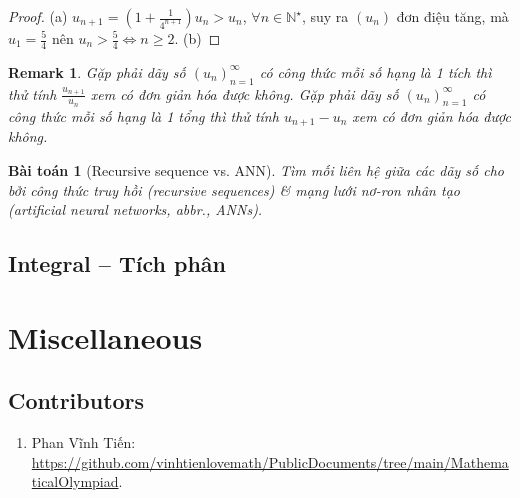 \documentclass{article}
\newtheorem{baitoan}{Bài toán}
\newtheorem{remark}{Remark}
\begin{document}
\begin{proof}
	(a) $u_{n+1} = \left(1 + \frac{1}{4^{n+1}}\right)u_n > u_n$, $\forall n\in\mathbb{N}^\star$, suy ra $(u_n)$ đơn điệu tăng, mà $u_1 = \frac{5}{4}$ nên $u_n > \frac{5}{4}\Leftrightarrow n\ge2$. (b)
\end{proof}

\begin{remark}
	Gặp phải dãy số $(u_n)_{n=1}^\infty$ có công thức mỗi số hạng là 1 tích thì thử tính $\frac{u_{n+1}}{u_n}$ xem có đơn giản hóa được không. Gặp phải dãy số $(u_n)_{n=1}^\infty$ có công thức mỗi số hạng là 1 tổng thì thử tính $u_{n+1} - u_n$ xem có đơn giản hóa được không.
\end{remark}

\begin{baitoan}[Recursive sequence vs. ANN]
	Tìm mối liên hệ giữa các dãy số cho bởi công thức truy hồi (recursive sequences) \& mạng lưới nơ-ron nhân tạo (artificial neural networks, abbr., ANNs).
\end{baitoan}


\subsection{Integral -- Tích phân}


\section{Miscellaneous}

\subsection{Contributors}

\begin{enumerate}
	\item {\sc Phan Vĩnh Tiến}: \url{https://github.com/vinhtienlovemath/PublicDocuments/tree/main/MathematicalOlympiad}.
\end{enumerate}


\printbibliography[heading=bibintoc]
	
\end{document}

